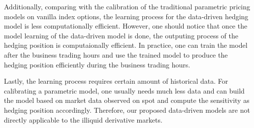 \documentclass[letterpaper,12pt,titlepage,oneside,final]{book}
\numberwithin{equation}{section}
\theoremstyle{definition}
\begin{document}
Additionally, comparing with the calibration of the traditional parametric pricing models on vanilla index options, the learning process for the data-driven hedging model is less computationally efficient. However, one should notice that once the model learning of the data-driven model is done, the outputing process of the hedging position is computaionally efficient. In practice, one can train the model after the business trading hours and use  the trained model to produce the hedging position efficiently  during the business trading hours.

Lastly, the learning process requires certain amount of historical data. For calibrating a parametric model, one usually needs much less data and  can  build the model based on market data observed on spot and compute the sensitivity as hedging position accordingly.  Therefore, our proposed data-driven models are not directly applicable to the illiquid derivative markets.  
\end{document}

